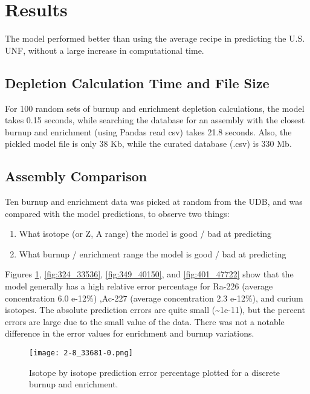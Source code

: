 \section{Results}

The model performed better than using the average
recipe in predicting the U.S. \gls{UNF}, without
a large increase in computational time.


\subsection{Depletion Calculation Time and File Size}

For 100 random sets of
burnup and enrichment depletion calculations,
the model takes 0.15 seconds, while
searching the database for an assembly
with the closest burnup and enrichment (using Pandas read csv)
takes 21.8 seconds. Also, the pickled model file is only
38 Kb, while the curated database (.csv) is 330 Mb.

\subsection{Assembly Comparison}

Ten burnup and enrichment data was picked at random from the \gls{UDB},
and was compared with the model predictions, to observe
two things:
\begin{enumerate}
    \item What isotope (or Z, A range) the model is good / bad
        at predicting
    \item What burnup / enrichment range the model is good / bad
        at predicting
\end{enumerate}

Figures \ref{fig:28_33681}, \ref{fig:324_33536},
\ref{fig:349_40150}, and \ref{fig:401_47722}
show that the model
generally has a high relative error percentage for Ra-226
(average concentration 6.0 e-12\%) ,Ac-227 (average concentration  2.3 e-12\%), and curium isotopes.
The absolute prediction errors are quite small
(\textasciitilde 1e-11), but the percent errors are large due
to the small value of the data. There was not a notable
difference in the error values for enrichment
and burnup variations.

\begin{figure}
    \centering
    \texttt{[image: 2-8\_33681-0.png]}
    \caption{Isotope by isotope prediction error percentage
             plotted for a discrete burnup and enrichment.}
    \label{fig:28_33681}
\end{figure}


